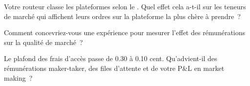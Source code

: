\begin{interviewq}\label{iq:mx:fees-rebates-and-venue-economics:4}
Votre routeur classe les plateformes selon le . Quel effet cela a-t-il sur les teneurs de marché qui affichent leurs ordres sur la plateforme la plus chère à prendre~?
\end{interviewq}

\begin{interviewq}\label{iq:mx:fees-rebates-and-venue-economics:5}
Comment concevriez-vous une expérience pour mesurer l'effet des rémunérations sur la qualité de marché~?
\end{interviewq}

\begin{interviewq}\label{iq:mx:fees-rebates-and-venue-economics:6}
Le plafond des frais d'accès passe de 0.30 à 0.10 cent. Qu'advient-il des rémunérations maker-taker, des files d'attente et de votre P\&L en market making~?
\end{interviewq}
